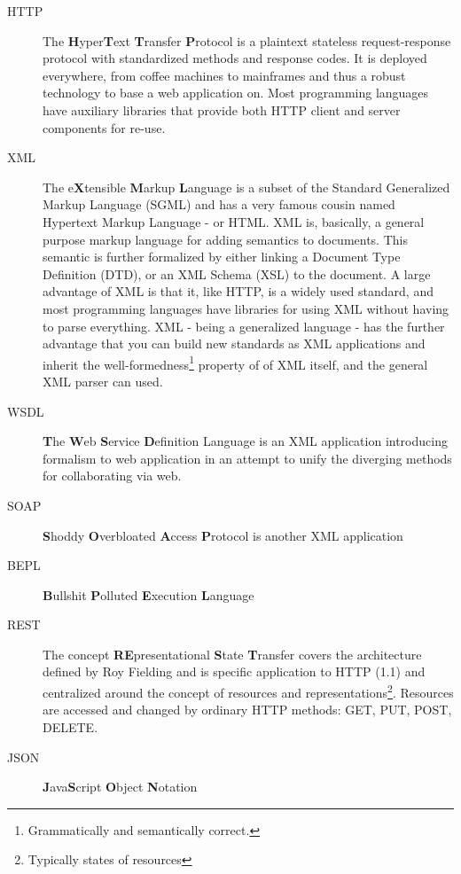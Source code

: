 \begin{description}
\item[HTTP] The \textbf{H}yper\textbf{T}ext \textbf{T}ransfer \textbf{P}rotocol is a plaintext stateless request-response protocol with standardized methods and response codes. It is deployed everywhere, from coffee machines to mainframes and thus a robust technology to base a web application on. Most programming languages have auxiliary libraries that provide both HTTP client and server components for re-use.
\item[XML] The e\textbf{X}tensible \textbf{M}arkup \textbf{L}anguage is a subset of the Standard Generalized Markup Language (SGML) and has a very famous cousin named Hypertext Markup Language - or HTML. XML is, basically, a general purpose markup language for adding semantics to documents. This semantic is further formalized by either linking a Document Type Definition (DTD), or an XML Schema (XSL) to the document. A large advantage of XML is that it, like HTTP, is a widely used standard, and most programming languages have libraries for using XML without having to parse everything. XML - being a generalized language - has the further advantage that you can build new standards as XML applications and inherit the well-formedness\footnote{Grammatically and semantically correct.} property of of XML itself, and the general XML parser can used.
\item[WSDL] \textbf{T}he \textbf{W}eb \textbf{S}ervice \textbf{D}efinition Language is an XML application introducing formalism to web application in an attempt to unify the diverging methods for collaborating via web.

\item[SOAP] \textbf{S}hoddy \textbf{O}verbloated \textbf{A}ccess \textbf{P}rotocol is another XML application %
\item[BEPL] \textbf{B}ullshit \textbf{P}olluted \textbf{E}xecution \textbf{L}anguage %

\item[REST] The concept \textbf{RE}presentational \textbf{S}tate \textbf{T}ransfer covers the architecture defined by Roy Fielding and is specific application to HTTP (1.1) and centralized around the concept of resources and representations\footnote{Typically states of resources}. Resources are accessed and changed by ordinary HTTP methods: GET, PUT, POST, DELETE.
\item[JSON] \textbf{J}ava\textbf{S}cript \textbf{O}bject \textbf{N}otation

\end{description}